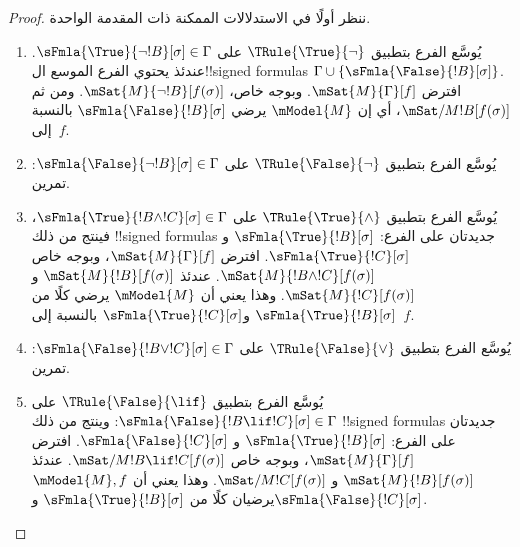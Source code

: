 \documentclass[../../../include/open-logic-section]{subfiles}
\begin{document}
\begin{proof}
ننظر أولًا في الاستدلالات الممكنة ذات المقدمة الواحدة.
\begin{enumerate}
\item يُوسَّع الفرع بتطبيق $\TRule{\True}{\lnot}$ على
  $\sFmla{\True}{\lnot !B}[\sigma] \in \Gamma$. عندئذ يحتوي الفرع
  الموسع ال!!{signed formula}s $\Gamma \cup
  \{\sFmla{\False}{!B}[\sigma]\}$. افترض $\mSat{M}{\Gamma}[f]$.
  وبوجه خاص، $\mSat{M}{\lnot !B}[f(\sigma)]$. ومن ثم
  $\mSat/{M}{!B}[f(\sigma)]$، أي إن $\mModel{M}$ يرضي
  $\sFmla{\False}{!B}[\sigma]$ بالنسبة إلى~$f$.
\item يُوسَّع الفرع بتطبيق $\TRule{\False}{\lnot}$ على
  $\sFmla{\False}{\lnot !B}[\sigma] \in \Gamma$: تمرين.
\item يُوسَّع الفرع بتطبيق $\TRule{\True}{\land}$ على
  $\sFmla{\True}{!B \land !C}[\sigma] \in \Gamma$، فينتج من ذلك
  !!{signed formula}s جديدتان على الفرع:
  $\sFmla{\True}{!B}[\sigma]$ و$\sFmla{\True}{!C}[\sigma]$. افترض
  $\mSat{M}{\Gamma}[f]$، وبوجه خاص $\mSat{M}{!B \land
    !C}[f(\sigma)]$. عندئذ $\mSat{M}{!B}[f(\sigma)]$ و
  $\mSat{M}{!C}[f(\sigma)]$. وهذا يعني أن $\mModel{M}$ يرضي كلًا من
  $\sFmla{\True}{!B}[\sigma]$ و$\sFmla{\True}{!C}[\sigma]$ بالنسبة
  إلى~$f$.
\item يُوسَّع الفرع بتطبيق $\TRule{\False}{\lor}$ على
  $\sFmla{\False}{!B \lor !C}[\sigma] \in \Gamma$: تمرين.
\item يُوسَّع الفرع بتطبيق $\TRule{\False}{\lif}$ على
  $\sFmla{\False}{!B \lif !C}[\sigma] \in \Gamma$: وينتج من ذلك
  !!{signed formula}s جديدتان على الفرع: $\sFmla{\True}{!B}[\sigma]$ و
  $\sFmla{\False}{!C}[\sigma]$. افترض
  $\mSat{M}{\Gamma}[f]$، وبوجه خاص
  $\mSat/{M}{!B \lif !C}[f(\sigma)]$. عندئذ
  $\mSat{M}{!B}[f(\sigma)]$ و
  $\mSat/{M}{!C}[f(\sigma)]$. وهذا يعني أن
  $\mModel{M}, f$ يرضيان كلًا من
  $\sFmla{\True}{!B}[\sigma]$ و$\sFmla{\False}{!C}[\sigma]$.

\end{enumerate}
\end{proof}
\end{document}
